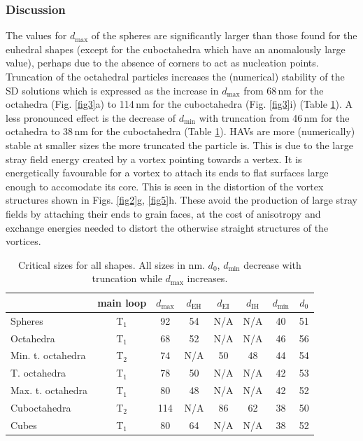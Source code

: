 \documentclass[review,authoryear]{elsarticle}
\newcommand{\dmax}{d_\text{max}}
\newcommand{\dmin}{d_\text{min}}
\newcommand{\nm}{\,\text{nm}}
\begin{document}
\subsubsection{Discussion}
The values for $\dmax$ of the spheres are significantly larger than those found for the euhedral shapes (except for the cuboctahedra which have an anomalously large value), perhaps due to the absence of corners to act as nucleation points. Truncation of the octahedral particles increases the (numerical) stability of the SD solutions which is expressed as the increase in $\dmax$ from 68$\nm$ for the octahedra (Fig. \ref{fig3}a) to 114$\nm$ for the cuboctahedra (Fig. \ref{fig3}i) (Table \ref{table1}). A less pronounced effect is the decrease of $\dmin$ with truncation from 46$\nm$ for the octahedra to 38$\nm$ for the cuboctahedra (Table \ref{table1}). HAVs are more (numerically) stable at smaller sizes the more truncated the particle is. This is due to the large stray field energy created by a vortex pointing towards a vertex. It is energetically favourable for a vortex to attach its ends to flat surfaces large enough to accomodate its core. This is seen in the distortion of the vortex structures shown in Figs. \ref{fig2}g, \ref{fig5}h. These avoid the production of large stray fields by attaching their ends to grain faces, at the cost of anisotropy and exchange energies needed to distort the otherwise straight structures of the vortices.\par
\begin{table}[ht]
\centering
\begin{tabular}{| l || c | c | c | c | c | c | c |}
\hline
       & main loop & $\dmax$ & $d_\text{EH}$ & $d_\text{EI}$ & $d_\text{IH}$ & $\dmin$ & $d_0$ \\
\hline
Spheres & T$_1$ & 92 & 54 & N/A & N/A & 40 & 51 \\
\hline
Octahedra & T$_1$ & 68 & 52 & N/A & N/A & 46 & 56 \\
\hline
Min. t. octahedra & T$_2$ & 74 & N/A & 50 & 48 & 44 & 54 \\
\hline
T. octahedra & T$_1$ & 78 & 50 & N/A & N/A & 42 & 53 \\
\hline
Max. t. octahedra & T$_1$ & 80 & 48 & N/A & N/A & 42 & 52 \\
\hline
Cuboctahedra & T$_2$ & 114 & N/A & 86 & 62 & 38 & 50 \\
\hline
Cubes & T$_1$ & 80 & 64 & N/A & N/A & 38 & 52 \\
\hline
\end{tabular}
\caption{Critical sizes for all shapes. All sizes in nm. $d_0$, $\dmin$ decrease with truncation while $\dmax$ increases.}
\label{table1}
\end{table}
\end{document}
